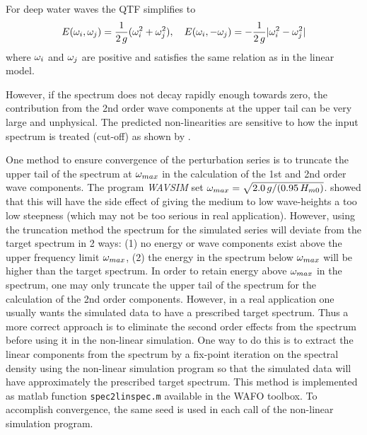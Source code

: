 For deep water waves the QTF simplifies to
\begin{equation}
  \label{eq:EsumAndEdiff}
  E(\omega _{i},\omega _{j}) = \frac{1}{2\,g}(\omega _{i}^{2}+\omega _{j}^{2}),
\quad
  E(\omega _{i},-\omega _{j}) = -\frac{1}{2\,g}|\omega _{i}^{2}-\omega _{j}^{2}|
\end{equation}
where $\omega _{i}$ and $\omega _{j}$ are positive and
satisfies the same relation as in the linear model.

However, if the spectrum does not decay rapidly enough towards zero, the
contribution from the 2nd order wave components at the upper tail can
be very large and unphysical. The predicted non-linearities are
sensitive to how the input spectrum is treated (cut-off) as shown by
\cite{Stansberg1994SecondOrder}.

One method to ensure convergence of the perturbation series is to
truncate the upper tail of the spectrum at $\omega _{max}$ in the calculation
of the 1st and 2nd order wave components.
The \cite{NestegardAndStokka1995Third}
program \textit{WAVSIM} set $\omega _{max}=\sqrt{2.0\,g/(0.95\, H_{m0})}$.
\cite{BrodtkorbEtal2000JointICCE} showed that this will
have the side effect of giving the medium to low wave-heights a
too low steepness (which may not be too serious in real application).
 However, using the truncation method
the spectrum for the simulated series will deviate from the target
spectrum in 2 ways: (1) no energy or wave components exist above the upper
frequency limit $\omega _{max}$, (2) the energy in the spectrum below
$\omega _{max}$ will be higher than the target spectrum.
In order to retain energy above $\omega _{max}$ in the spectrum, one may
only truncate the upper tail of the spectrum for the calculation of
the 2nd order components.
However, in a real application one usually
 wants the simulated data to have a
prescribed target spectrum. Thus a
 more correct approach is to eliminate the
second order effects from the spectrum before using it in the non-linear
simulation. One way to do this is to extract the linear
components from the spectrum by a fix-point iteration on the
spectral density using the non-linear simulation program
so that the simulated data will have approximately the
prescribed target spectrum.
This method %
is implemented as matlab function
 \verb+spec2linspec.m+ available
in the WAFO toolbox.
To accomplish convergence, the same seed is used in each call of the
non-linear simulation program.

